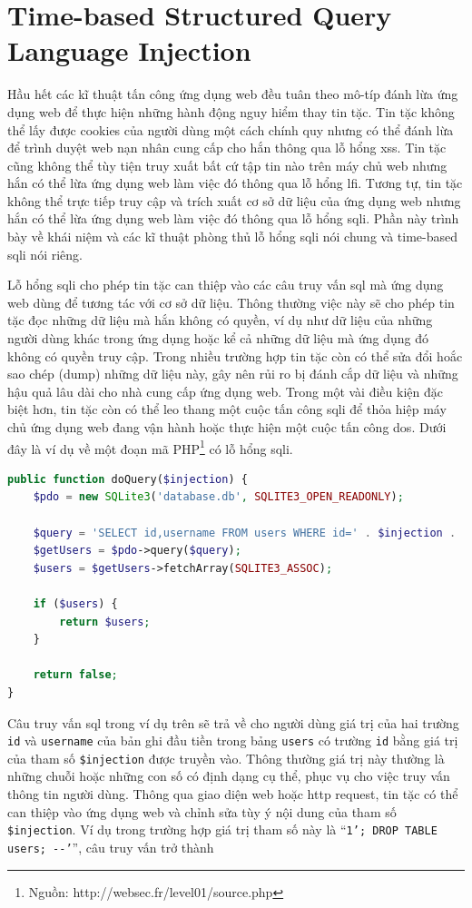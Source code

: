 \section{Time-based Structured Query Language Injection}
Hầu hết các kĩ thuật tấn công ứng dụng web đều tuân theo mô-típ đánh lừa ứng dụng web để thực hiện những hành động nguy hiểm thay tin tặc. Tin tặc không thể lấy được cookies của người dùng một cách chính quy nhưng có thể đánh lừa để trình duyệt web nạn nhân cung cấp cho hắn thông qua lỗ hổng \acrshort{xss}. Tin tặc cũng không thể tùy tiện truy xuất bất cứ tập tin nào trên máy chủ web nhưng hắn có thể lừa ứng dụng web làm việc đó thông qua lỗ hổng \acrshort{lfi}. Tương tự, tin tặc không thể trực tiếp truy cập và trích xuất cơ sở dữ liệu của ứng dụng web nhưng hắn có thể lừa ứng dụng web làm việc đó thông qua lỗ hổng \acrfull{sqli}. Phần này trình bày về khái niệm và các kĩ thuật phòng thủ lỗ hổng \acrshort{sqli} nói chung và time-based \acrshort{sqli} nói riêng.\par
Lỗ hổng \acrfull{sqli} \parencite{li2011survey,sullivan2011web} cho phép tin tặc can thiệp vào các câu truy vấn \acrshort{sql} mà ứng dụng web dùng để tương tác với cơ sở dữ liệu. Thông thường việc này sẽ cho phép tin tặc đọc những dữ liệu mà hắn không có quyền, ví dụ như dữ liệu của những người dùng khác trong ứng dụng hoặc kể cả những dữ liệu mà ứng dụng đó không có quyền truy cập. Trong nhiều trường hợp tin tặc còn có thể sửa đổi hoắc sao chép (dump) những dữ liệu này, gây nên rủi ro bị đánh cắp dữ liệu và những hậu quả lâu dài cho nhà cung cấp ứng dụng web. Trong một vài điều kiện đặc biệt hơn, tin tặc còn có thể leo thang một cuộc tấn công \acrshort{sqli} để thỏa hiệp máy chủ ứng dụng web đang vận hành hoặc thực hiện một cuộc tấn công \acrshort{dos}. Dưới đây là ví dụ về một đoạn mã PHP\footnote{Nguồn: http://websec.fr/level01/source.php} có lỗ hổng \acrshort{sqli}.
\begin{lstlisting}[language=php]
public function doQuery($injection) {
    $pdo = new SQLite3('database.db', SQLITE3_OPEN_READONLY);
    
    $query = 'SELECT id,username FROM users WHERE id=' . $injection . ' LIMIT 1';
    $getUsers = $pdo->query($query);
    $users = $getUsers->fetchArray(SQLITE3_ASSOC);

    if ($users) {
        return $users;
    }

    return false;
}
\end{lstlisting}
Câu truy vấn \acrshort{sql} trong ví dụ trên sẽ trả về cho người dùng giá trị của hai trường \texttt{id} và \texttt{username} của bản ghi đầu tiền trong bảng \texttt{users} có trường \texttt{id} bằng giá trị của tham số \texttt{\$injection} được truyền vào. Thông thường giá trị này thường là những chuỗi hoặc những con số có định dạng cụ thể, phục vụ cho việc truy vấn thông tin người dùng. Thông qua giao diện web hoặc \acrshort{http} request, tin tặc có thể can thiệp vào ứng dụng web và chỉnh sửa tùy ý nội dung của tham số \texttt{\$injection}. Ví dụ trong trường hợp giá trị tham số này là ``\colorbox{gray!30}{\texttt{1'; DROP TABLE users; -{}-'}}'', câu truy vấn trở thành\\
